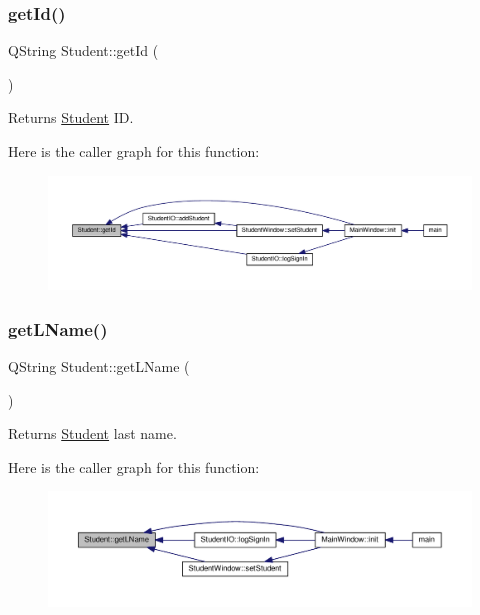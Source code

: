\subsubsection{\texorpdfstring{get\+Id()}{getId()}}
{\footnotesize\ttfamily Q\+String Student\+::get\+Id (\begin{DoxyParamCaption}{ }\end{DoxyParamCaption})}

\begin{DoxyReturn}{Returns}
\hyperlink{class_student}{Student} ID. 
\end{DoxyReturn}
Here is the caller graph for this function\+:
\nopagebreak
\begin{figure}[H]
\begin{center}
\leavevmode
\includegraphics[width=350pt]{class_student_ac314c299fce856ec970b3a358ca4ea86_icgraph}
\end{center}
\end{figure}
\mbox{\label{class_student_a78345c7bbbb179675b332facbc45c11f}} 
\subsubsection{\texorpdfstring{get\+L\+Name()}{getLName()}}
{\footnotesize\ttfamily Q\+String Student\+::get\+L\+Name (\begin{DoxyParamCaption}{ }\end{DoxyParamCaption})}

\begin{DoxyReturn}{Returns}
\hyperlink{class_student}{Student} last name. 
\end{DoxyReturn}
Here is the caller graph for this function\+:
\nopagebreak
\begin{figure}[H]
\begin{center}
\leavevmode
\includegraphics[width=350pt]{class_student_a78345c7bbbb179675b332facbc45c11f_icgraph}
\end{center}
\end{figure}
\mbox{\label{class_student_a897fcf6f93b238dec7272f36397ab2d1}} 
